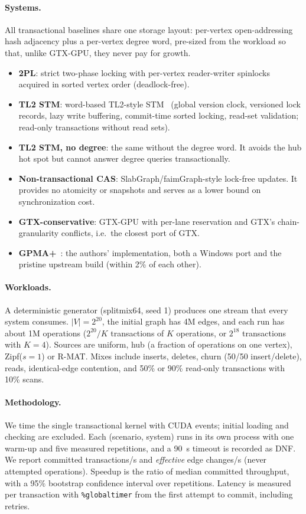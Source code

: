 \documentclass[sigconf,nonacm]{acmart}
\newcommand{\sys}{GTX-GPU}
\newcommand{\code}[1]{\texttt{#1}}
\begin{document}
\paragraph{Systems.} All transactional baselines share one storage layout: per-vertex open-addressing hash adjacency
plus a per-vertex degree word, pre-sized from the workload so that, unlike \sys{}, they never pay for growth.
\begin{itemize}
\item \textbf{2PL}: strict two-phase locking with per-vertex reader-writer spinlocks acquired in sorted vertex order
(deadlock-free).
\item \textbf{TL2 STM}: word-based TL2-style STM~\cite{tl2} (global version clock, versioned lock records, lazy write
buffering, commit-time sorted locking, read-set validation; read-only transactions without read sets).
\item \textbf{TL2 STM, no degree}: the same without the degree word. It avoids the hub hot spot but cannot answer
degree queries transactionally.
\item \textbf{Non-transactional CAS}: SlabGraph/faimGraph-style lock-free updates. It provides no atomicity or
snapshots and serves as a lower bound on synchronization cost.
\item \textbf{GTX-conservative}: \sys{} with per-lane reservation and GTX's chain-granularity conflicts, i.e.\ the
closest port of GTX.
\item \textbf{GPMA+}~\cite{gpma}: the authors' implementation, both a Windows port and the pristine upstream build
(within 2\% of each other).
\end{itemize}

\paragraph{Workloads.} A deterministic generator (splitmix64, seed 1) produces one stream that every system consumes.
$|V| = 2^{20}$, the initial graph has 4M edges, and each run has about 1M operations
($2^{20}/K$ transactions of $K$ operations, or $2^{18}$ transactions with $K{=}4$). Sources are uniform, hub
(a fraction of operations on one vertex), Zipf($s{=}1$) or R-MAT. Mixes include inserts, deletes, churn
(50/50 insert/delete), reads, identical-edge contention, and 50\% or 90\% read-only transactions with 10\% scans.

\paragraph{Methodology.} We time the single transactional kernel with CUDA events; initial loading and checking are
excluded. Each (scenario, system) runs in its own process with one warm-up and five measured repetitions, and a 90~s
timeout is recorded as DNF. We report committed transactions/s and \emph{effective} edge changes/s (never attempted
operations). Speedup is the ratio of median committed throughput, with a 95\% bootstrap confidence interval over
repetitions. Latency is measured per transaction with \code{\%globaltimer} from the first attempt to commit, including
retries.
\end{document}
